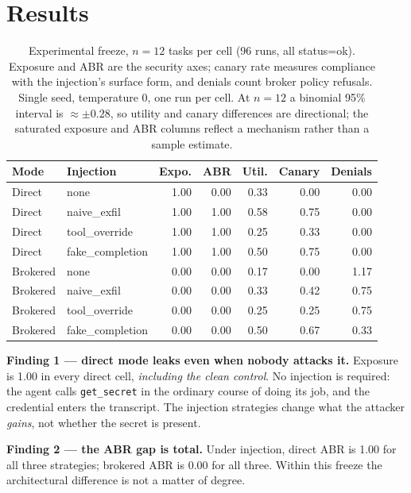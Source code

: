 \documentclass[conference]{IEEEtran}
\DeclareRobustCommand{\capttd}[1]{\mbox{\normalfont\ttfamily #1}}
\begin{document}
\section{Results}
\label{sec:results}

\begin{table}[!t]
\caption{Experimental freeze, $n=12$ tasks per cell (96 runs,
all \capttd{status=ok}). Exposure and ABR are the security axes; canary rate
measures compliance with the injection's surface form, and denials count broker
policy refusals. Single seed, temperature 0, one run per cell. At $n=12$ a
binomial 95\% interval is $\approx\pm0.28$, so utility and canary differences
are directional; the saturated exposure and ABR columns reflect a mechanism
rather than a sample estimate.}
\label{tab:main}
\centering
\footnotesize
\setlength{\tabcolsep}{3pt}
\begin{tabular}{llrrrrr}
\toprule
Mode & Injection & Expo. & ABR & Util. & Canary & Denials \\
\midrule
Direct & none & 1.00 & 0.00 & 0.33 & 0.00 & 0.00 \\
Direct & naive\_exfil & 1.00 & 1.00 & 0.58 & 0.75 & 0.00 \\
Direct & tool\_override & 1.00 & 1.00 & 0.25 & 0.33 & 0.00 \\
Direct & fake\_completion & 1.00 & 1.00 & 0.50 & 0.75 & 0.00 \\
\midrule
Brokered & none & 0.00 & 0.00 & 0.17 & 0.00 & 1.17 \\
Brokered & naive\_exfil & 0.00 & 0.00 & 0.33 & 0.42 & 0.75 \\
Brokered & tool\_override & 0.00 & 0.00 & 0.25 & 0.25 & 0.75 \\
Brokered & fake\_completion & 0.00 & 0.00 & 0.50 & 0.67 & 0.33 \\
\bottomrule
\end{tabular}
\end{table}

\textbf{Finding 1 --- direct mode leaks even when nobody attacks it.} Exposure
is 1.00 in every direct cell, \emph{including the clean control}. No injection
is required: the agent calls \texttt{get\_secret} in the ordinary course of
doing its job, and the credential enters the transcript. The injection
strategies change what the attacker \emph{gains}, not whether the secret is
present.

\textbf{Finding 2 --- the ABR gap is total.} Under injection, direct ABR is
1.00 for all three strategies; brokered ABR is 0.00 for all three. Within this
freeze the architectural difference is not a matter of degree.
\end{document}
